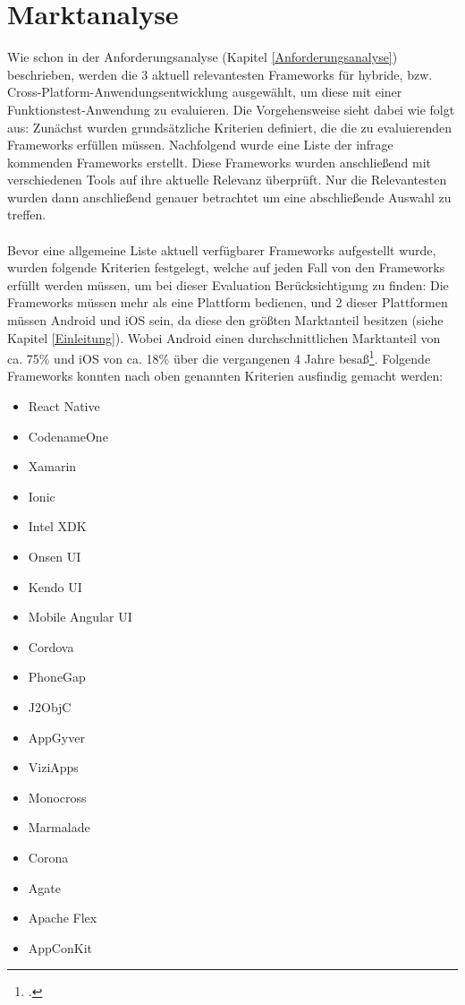 \chapter{Marktanalyse} \label{Marktanalyse}

Wie schon in der Anforderungsanalyse (Kapitel \ref{Anforderungsanalyse}) beschrieben, werden die 3 aktuell relevantesten Frameworks für hybride, bzw. Cross-Platform-Anwendungsentwicklung ausgewählt, um diese mit einer Funktionstest-Anwendung zu evaluieren. Die Vorgehensweise sieht dabei wie folgt aus: Zunächst wurden grundsätzliche Kriterien definiert, die die zu evaluierenden Frameworks erfüllen müssen. Nachfolgend wurde eine Liste der infrage kommenden Frameworks erstellt. Diese Frameworks wurden anschließend mit verschiedenen Tools auf ihre aktuelle Relevanz überprüft. Nur die Relevantesten wurden dann anschließend genauer betrachtet um eine abschließende Auswahl zu treffen.
\\
\\
Bevor eine allgemeine Liste aktuell verfügbarer Frameworks aufgestellt wurde, wurden folgende Kriterien festgelegt, welche auf jeden Fall von den Frameworks erfüllt werden müssen, um bei dieser Evaluation Berücksichtigung zu finden: Die Frameworks müssen mehr als eine Plattform bedienen, und 2 dieser Plattformen müssen Android und iOS sein, da diese den größten Marktanteil besitzen (siehe Kapitel \ref{Einleitung}). Wobei Android einen durchschnittlichen Marktanteil von ca. 75\% und iOS von ca. 18\% über die vergangenen 4 Jahre besaß\footcite{Statista}.
Folgende Frameworks konnten nach oben genannten Kriterien ausfindig gemacht werden:
\\
\begin{itemize}
\item React Native
\item CodenameOne
\item Xamarin
\item Ionic
\item Intel XDK
\item Onsen UI
\item Kendo UI
\item Mobile Angular UI
\item Cordova
\item PhoneGap
\item J2ObjC
\item AppGyver
\item ViziApps
\item Monocross
\item Marmalade
\item Corona
\item Agate
\item Apache Flex
\item AppConKit
\end{itemize}

